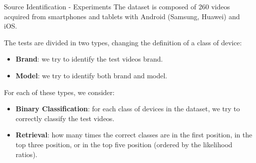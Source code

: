 \begin{tframe}{Source Identification - Experiments}
The dataset is composed of 260 videos acquired from smartphones and tablets with Android (Samsung, Huawei) and iOS.
\vspace{0.2cm}

The tests are divided in two types, changing the definition of a class of device:

\begin{itemize}
\item \textbf{Brand}: we try to identify the test videos brand.
\vspace{0.1cm}
\item \textbf{Model}: we try to identify both brand and model.
\end{itemize}
\vspace{0.2cm}

For each of these types, we consider:

\begin{itemize}
\item \textbf{Binary Classification}: for each class of devices in the dataset, we try to correctly classify the test videos.
\vspace{0.1cm}
\item \textbf{Retrieval}: how many times the correct classes are in the first position, in the top three position, or in the top five position (ordered by the likelihood ratios).
\end{itemize}

\end{tframe}

